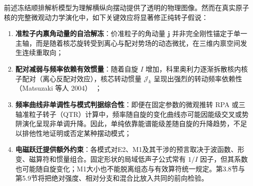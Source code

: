 前述冻结顺排解析模型为理解横纵向摆动提供了透明的物理图像。然而在真实原子核的完整微观动力学演化中，如下关键效应将显著修正纯转子假说：
\begin{enumerate}
\item \textbf{准粒子内禀角动量的自洽解冻}：价准粒子的角动量 $\mathbf{j}$ 并非完全刚性锚定于单一主轴，而是随着核芯旋转受到离心与配对势场的动态微扰，在三维内禀空间发生连续重取向；
\item \textbf{配对减弱与频率依赖有效惯量}：随着自旋 $I$ 增加，科里奥利力逐渐拆散核内核子配对（离心反配对效应），核芯转动惯量 $\mathcal{J}_k$ 呈现出强烈的转动频率依赖性（Matsuzaki 等人 2004）~\cite{matsuzaki-2004-nuclear-inertia-and-wobbling}；
\item \textbf{频率曲线非单调性与模式判据综合性}：即便在固定参数的微观推转 RPA 或三轴准粒子转子（QTR）计算中，频率随自旋的变化曲线亦可能因能级交叉或势阱演化呈现非单调升降。因此，单纯依靠能谱能级差随自旋的升降趋势，不足以排他性地证明或否定某种摆动模式；
\item \textbf{电磁跃迁提供额外约束}：各模式对E2、M1及其干涉的预言取决于波函数、形变、磁算符和惯量组合。固定形状的局域低声子公式常有 $1/I$ 因子，但其系数也可能随自旋变化；M1大小也不能脱离组态与有效算符统一规定。第3.8节与第5.9节将把绝对强度、相对分支和混合比放入共同的前向检验。
\end{enumerate}
